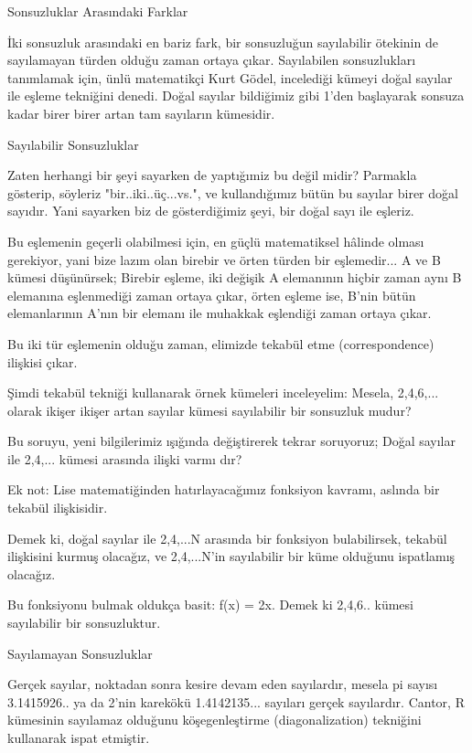 \documentclass[12pt,fleqn]{article}\usepackage{../../common}
\begin{document}
Sonsuzluklar Arasındaki Farklar

İki sonsuzluk arasındaki en bariz fark, bir sonsuzluğun sayılabilir
ötekinin de sayılamayan türden olduğu zaman ortaya çıkar. Sayılabilen
sonsuzlukları tanımlamak için, ünlü matematikçi Kurt Gödel, incelediği
kümeyi doğal sayılar ile eşleme tekniğini denedi. Doğal sayılar bildiğimiz
gibi 1'den başlayarak sonsuza kadar birer birer artan tam sayıların
kümesidir.

Sayılabilir Sonsuzluklar

Zaten herhangi bir şeyi sayarken de yaptığımiz bu değil midir? Parmakla
gösterip, söyleriz "bir..iki..üç...vs.", ve kullandığımız bütün bu sayılar
birer doğal sayıdır. Yani sayarken biz de gösterdiğimiz şeyi, bir doğal
sayı ile eşleriz.

Bu eşlemenin geçerli olabilmesi için, en güçlü matematiksel hâlinde olması
gerekiyor, yani bize lazım olan birebir ve örten türden bir eşlemedir... A
ve B kümesi düşünürsek; Birebir eşleme, iki değişik A elemanının hiçbir
zaman aynı B elemanına eşlenmediği zaman ortaya çıkar, örten eşleme ise,
B'nin bütün elemanlarının A'nın bir elemanı ile muhakkak eşlendiği zaman
ortaya çıkar.

Bu iki tür eşlemenin olduğu zaman, elimizde tekabül etme (correspondence)
ilişkisi çıkar.

Şimdi tekabül tekniği kullanarak örnek kümeleri inceleyelim: Mesela,
2,4,6,... olarak ikişer ikişer artan sayılar kümesi sayılabilir bir
sonsuzluk mudur?

Bu soruyu, yeni bilgilerimiz ışığında değiştirerek tekrar soruyoruz; Doğal
sayılar ile {2,4,...} kümesi arasında ilişki varmı dır?

Ek not: Lise matematiğinden hatırlayacağımız fonksiyon kavramı, aslında bir
tekabül ilişkisidir.

Demek ki, doğal sayılar ile {2,4,...N} arasında bir fonksiyon bulabilirsek,
tekabül ilişkisini kurmuş olacağız, ve {2,4,...N}'in sayılabilir bir küme
olduğunu ispatlamış olacağız.

Bu fonksiyonu bulmak oldukça basit: f(x) = 2x. Demek ki {2,4,6..} kümesi
sayılabilir bir sonsuzluktur.

Sayılamayan Sonsuzluklar

Gerçek sayılar, noktadan sonra kesire devam eden sayılardır, mesela pi
sayısı 3.1415926.. ya da 2'nin karekökü 1.4142135... sayıları gerçek
sayılardır. Cantor, R kümesinin sayılamaz olduğunu köşegenleştirme
(diagonalization) tekniğini kullanarak ispat etmiştir.
\end{document}
